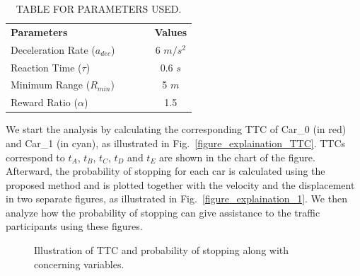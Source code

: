 \documentclass[twocolumn,10pt]{asme2e}
\begin{document}
\begin{table}[t]
\caption{TABLE FOR PARAMETERS USED.}
\begin{center}
\label{table_parameters}
\begin{tabular}{l l l l c}
& & \\ %
\hline
\textbf{Parameters} &  & & &\textbf{Values} \\
\hline
Deceleration Rate ($a_{dec}$) &  &  & & 6 $m/s^2$  \\
Reaction Time ($\tau$)        &  &  & & 0.6 $s$ \\
Minimum Range ($R_{min}$)     &  &  & & 5 $m$  \\
Reward Ratio ($\alpha$)      &  &  & & 1.5  \\
\hline
\end{tabular}
\end{center}
\end{table}
 
 
 We start the analysis by calculating the corresponding TTC of Car\_0 (in red) and Car\_1 (in cyan), as illustrated in Fig.~\ref{figure_explaination_TTC}. TTCs correspond to $t_A$, $t_B$, $t_C$, $t_D$ and $t_E$ are shown in the chart of the figure. Afterward, the probability of stopping for each car is calculated using the proposed method and is plotted together with the velocity and the displacement in two separate figures, as illustrated in Fig.~\ref{figure_explaination_1}. We then analyze how the probability of stopping can give assistance to the traffic participants using these figures.
 
 
\begin{figure}[htbp!]
    \centering
    \hfill
    \hfill
    
    \caption{Illustration of TTC and probability of stopping along with concerning variables.} \label{illustration}
\end{figure}
\end{document}
